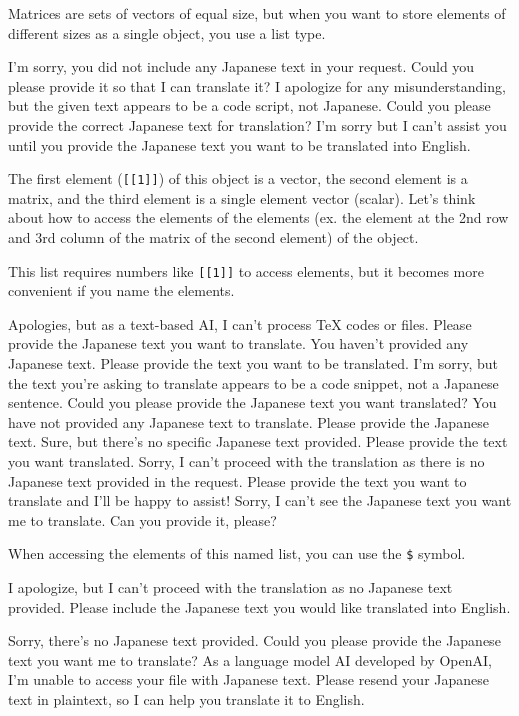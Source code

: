 \documentclass[
  a4paper,
]{book}
\begin{document}
Matrices are sets of vectors of equal size, but when you want to store
elements of different sizes as a single object, you use a list type.

I'm sorry, you did not include any Japanese text in your request. Could
you please provide it so that I can translate it? I apologize for any
misunderstanding, but the given text appears to be a code script, not
Japanese. Could you please provide the correct Japanese text for
translation? I'm sorry but I can't assist you until you provide the
Japanese text you want to be translated into English.

The first element (\texttt{{[}{[}1{]}{]}}) of this object is a vector,
the second element is a matrix, and the third element is a single
element vector (scalar). Let's think about how to access the elements of
the elements (ex. the element at the 2nd row and 3rd column of the
matrix of the second element) of the object.

This list requires numbers like \texttt{{[}{[}1{]}{]}} to access
elements, but it becomes more convenient if you name the elements.

Apologies, but as a text-based AI, I can't process TeX codes or files.
Please provide the Japanese text you want to translate. You haven't
provided any Japanese text. Please provide the text you want to be
translated. I'm sorry, but the text you're asking to translate appears
to be a code snippet, not a Japanese sentence. Could you please provide
the Japanese text you want translated? You have not provided any
Japanese text to translate. Please provide the Japanese text. Sure, but
there's no specific Japanese text provided. Please provide the text you
want translated. Sorry, I can't proceed with the translation as there is
no Japanese text provided in the request. Please provide the text you
want to translate and I'll be happy to assist! Sorry, I can't see the
Japanese text you want me to translate. Can you provide it, please?

When accessing the elements of this named list, you can use the
\texttt{\$} symbol.

I apologize, but I can't proceed with the translation as no Japanese
text provided. Please include the Japanese text you would like
translated into English.

Sorry, there's no Japanese text provided. Could you please provide the
Japanese text you want me to translate? As a language model AI developed
by OpenAI, I'm unable to access your file with Japanese text. Please
resend your Japanese text in plaintext, so I can help you translate it
to English.
\end{document}
